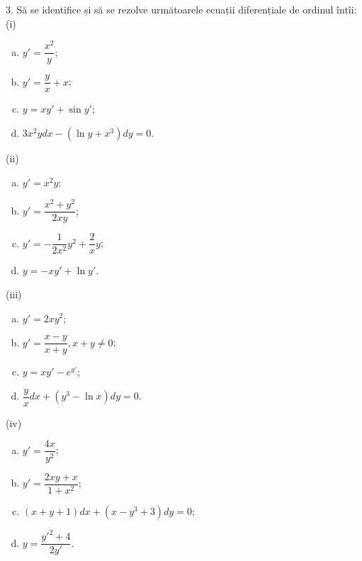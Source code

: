 \vspace{1cm}

3. Să se identifice și să se rezolve următoarele ecuații diferențiale
de ordinul întîi:
(i) \begin{enumerate}[(a)]
  \item $ y' = \dfrac{x^2}{y} $;
  \item $ y' = \dfrac{y}{x} + x $;
  \item $ y = xy' + \sin y' $;
  \item $ 3x^2y dx - (\ln y + x^3) dy = 0 $.
\end{enumerate}

(ii) \begin{enumerate}[(a)]
  \item $ y' = x^2 y $;
  \item $ y' = \dfrac{x^2 + y^2}{2xy} $;
  \item $ y' = - \dfrac{1}{2x^2} y^2 + \dfrac{2}{x} y $;
  \item $ y = -xy' + \ln y' $.
\end{enumerate}

(iii)
\begin{enumerate}[(a)]
  \item $ y' = 2xy^2 $;
  \item $ y' = \dfrac{x - y}{x + y}, x + y \neq 0 $;
  \item $ y = xy' - e^{y'} $;
  \item $ \dfrac{y}{x} dx + (y^3 - \ln x) dy = 0 $.
\end{enumerate}

(iv)
\begin{enumerate}[(a)]
  \item $ y' = \dfrac{4x}{y^2} $;
  \item $ y' = \dfrac{2xy + x}{1 + x^2} $;
  \item $ (x + y + 1) dx + (x - y^3 + 3)dy = 0 $;
  \item $ y = \dfrac{{y'}^2 + 4}{2y'} $.
\end{enumerate}


\vspace{1cm}

